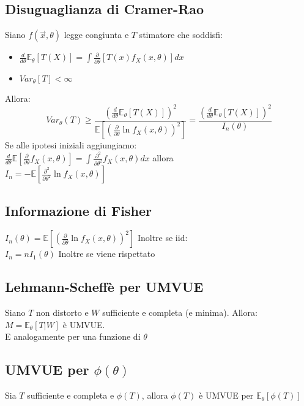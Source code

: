 \documentclass[a4paper,notitlepage]{report}%
\newcommand{\E}{\mathbb{E}} %
\begin{document}
\begin{multicols*}{2}
    \subsection*{Disuguaglianza di Cramer-Rao}
    Siano $f(\vec{x},\theta)$ legge congiunta e $T$ stimatore che soddisfi:
    \begin{itemize}
        \item $\frac{d}{d\theta} \E_\theta[T(X)] = \int \frac{\partial}{\partial \theta}[T(x)f_X(x,\theta)]dx$
        \item $Var_\theta[T]<\infty$
    \end{itemize}
    Allora:
    \[
        Var_\theta(T) \geq 
        \frac{(\frac{d}{d\theta} \E_\theta[T(X)])^2}{\E\left[ \left( \frac{\partial}{\partial\theta}\ln f_X(x,\theta) \right)^2 \right]}
        = \frac{(\frac{d}{d\theta} \E_\theta[T(X)])^2}{I_n(\theta)}
    \]
    Se alle ipotesi iniziali aggiungiamo:\\
    $\frac{d}{d\theta}\E[\frac{\partial}{\partial\theta}f_X(x,\theta)] = \int \frac{\partial^2}{\partial\theta^2}f_X(x,\theta) dx$ allora \\
    $I_n = - \E[\frac{\partial^2}{\partial\theta^2} \ln f_X(x,\theta)]$
 

    \subsection*{Informazione di Fisher}
    $I_n(\theta) = \E\left[ \left( \frac{\partial}{\partial\theta} \ln f_X(x,\theta) \right)^2 \right]$
    Inoltre se iid:\\
    $I_n = n I_1(\theta)$
    Inoltre se viene rispettato


    \subsection*{Lehmann-Scheffè per UMVUE}
    Siano $T$ non distorto e $W$ sufficiente e completa (e minima).
    Allora: \\
    $M=\E_\theta[T|W]$ è UMVUE.\\
    E analogamente per una funzione di $\theta$


    \subsection*{UMVUE per $\phi(\theta)$}
    Sia $T$ sufficiente e completa e $\phi(T)$, allora
    $\phi(T)$ è UMVUE per $\E_\theta[\phi(T)]$



\end{multicols*}
\end{document}
